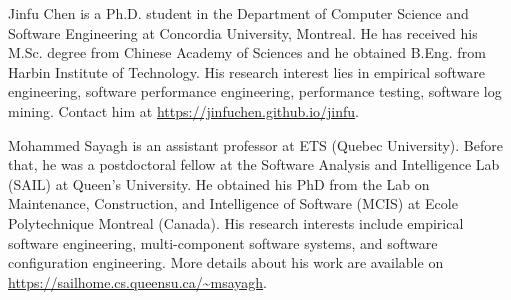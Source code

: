 \documentclass[10pt,journal,compsoc]{IEEEtran}
\begin{document}
\small{
 




\begin{IEEEbiography}
{Jinfu Chen}
is a Ph.D. student in the Department of Computer Science and Software Engineering at Concordia University, Montreal. He has received his M.Sc. degree from Chinese Academy of Sciences and he obtained B.Eng. from Harbin Institute of Technology. His research interest lies in empirical software engineering, software performance engineering, performance testing, software log mining. Contact him at \url{https://jinfuchen.github.io/jinfu}.
\end{IEEEbiography}

\begin{IEEEbiography}
{Mohammed Sayagh}
is an assistant professor at ETS (Quebec University). Before that, he was a postdoctoral fellow at the Software Analysis and Intelligence Lab (SAIL) at Queen’s University. He obtained his PhD from the Lab on Maintenance, Construction, and Intelligence of Software (MCIS) at Ecole Polytechnique Montreal (Canada). His research interests include empirical software engineering, multi-component software systems, and software configuration engineering. More details about his work are available on \url{https://sailhome.cs.queensu.ca/~msayagh}.
\end{IEEEbiography}

}
\end{document}
